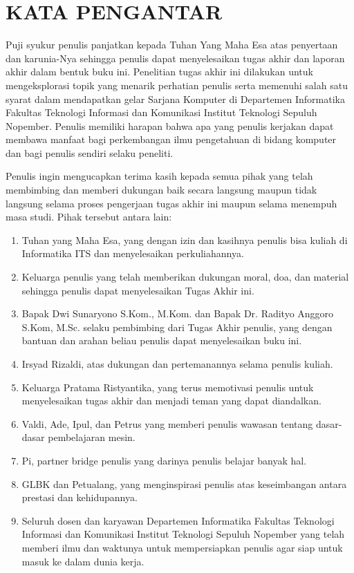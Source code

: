 \chapter {KATA PENGANTAR}

Puji syukur penulis panjatkan kepada Tuhan Yang Maha Esa atas penyertaan dan karunia-Nya sehingga penulis dapat menyelesaikan tugas akhir dan laporan akhir dalam bentuk buku ini. Penelitian tugas akhir ini dilakukan untuk mengeksplorasi topik yang menarik perhatian penulis serta memenuhi salah satu syarat dalam mendapatkan gelar Sarjana Komputer di Departemen Informatika Fakultas Teknologi Informasi dan Komunikasi Institut Teknologi Sepuluh Nopember. Penulis memiliki harapan bahwa apa yang penulis kerjakan dapat membawa manfaat bagi perkembangan ilmu pengetahuan di bidang komputer dan bagi penulis sendiri selaku peneliti.

Penulis ingin mengucapkan terima kasih kepada semua pihak yang telah membimbing dan memberi dukungan baik secara langsung maupun tidak langsung selama proses pengerjaan tugas akhir ini maupun selama menempuh masa studi. Pihak tersebut antara lain:

\begin {enumerate}
	\item Tuhan yang Maha Esa, yang dengan izin dan kasihnya penulis bisa kuliah di Informatika ITS dan menyelesaikan perkuliahannya.
	\item Keluarga penulis yang telah memberikan dukungan moral, doa, dan material sehingga penulis dapat menyelesaikan Tugas Akhir ini.
	\item Bapak Dwi Sunaryono S.Kom., M.Kom. dan Bapak Dr. Radityo Anggoro S.Kom, M.Sc.  selaku pembimbing dari Tugas Akhir penulis, yang dengan bantuan dan arahan beliau penulis dapat menyelesaikan buku ini.
	\item Irsyad Rizaldi, atas dukungan dan pertemanannya selama penulis kuliah.
	\item Keluarga Pratama Ristyantika, yang terus memotivasi penulis untuk menyelesaikan tugas akhir dan menjadi teman yang dapat diandalkan.
	\item Valdi, Ade, Ipul, dan Petrus yang memberi penulis wawasan tentang dasar-dasar pembelajaran mesin.
	\item Pi, partner bridge penulis yang darinya penulis belajar banyak hal.
	\item GLBK dan Petualang, yang menginspirasi penulis atas keseimbangan antara prestasi dan kehidupannya.
	\item Seluruh dosen dan karyawan Departemen Informatika Fakultas Teknologi Informasi dan Komunikasi Institut Teknologi Sepuluh Nopember yang telah memberi ilmu dan waktunya untuk mempersiapkan penulis agar siap untuk masuk ke dalam dunia kerja. 
\end {enumerate}

